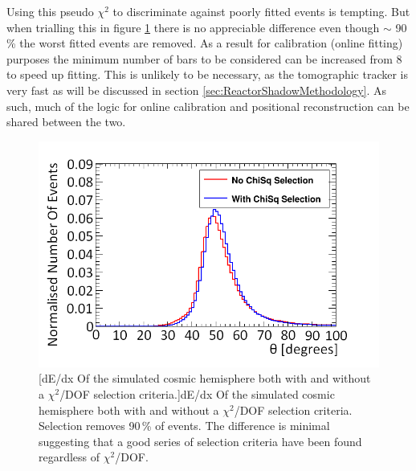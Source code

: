 Using this pseudo $\chi^2$ to discriminate against poorly fitted events is tempting. But when trialling this in figure \ref{fig:dedxGenVsRecoHem} there is no appreciable difference even though $\sim$ 90\,\% the worst fitted events are removed. As a result for calibration (online fitting) purposes the minimum number of bars to be considered can be increased from 8 to speed up fitting. This is unlikely to be necessary, as the tomographic tracker is very fast as will be discussed in section \ref{sec:ReactorShadowMethodology}. As such, much of the logic for online calibration and positional reconstruction can be shared between the two. 

\begin{figure} [!h]
\centering
  \includegraphics[width=0.5\linewidth]{Chapter6/Figs/Raster/simHemDeDxMedText.png}
  [dE/dx Of the simulated cosmic hemisphere both with and without a $\chi^2$/DOF selection criteria.]{dE/dx Of the simulated cosmic hemisphere both with and without a $\chi^2$/DOF selection criteria. Selection removes 90\,\% of events. The difference is minimal suggesting that a good series of selection criteria have been found regardless of $\chi^2$/DOF.}
  \label{fig:dedxGenVsRecoHem}
\end{figure}

